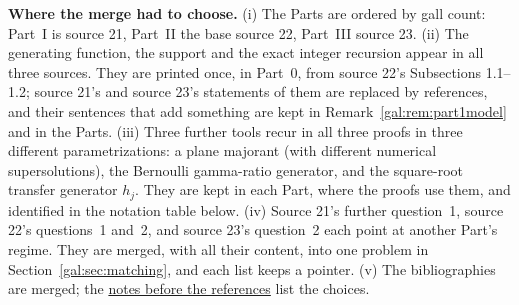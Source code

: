\documentclass[11pt,letterpaper]{article}
\numberwithin{equation}{section}
\theoremstyle{definition}\newtheorem{definition}[theorem]{Definition}
\theoremstyle{remark}\newtheorem{remark}[theorem]{Remark}
\begin{document}
\noindent\textbf{Where the merge had to choose.}
(i) The Parts are ordered by gall count: Part~I is source 21, Part~II the base source 22, Part~III source 23. (ii) The generating function, the support and the exact integer recursion appear in all three sources. They are printed once, in Part~0, from source 22's Subsections 1.1--1.2; source 21's and source 23's statements of them are replaced by references, and their sentences that add something are kept in Remark~\ref{gal:rem:part1model} and in the Parts. (iii) Three further tools recur in all three proofs in three different parametrizations: a plane majorant (with different numerical supersolutions), the Bernoulli gamma-ratio generator, and the square-root transfer generator $h_j$. They are kept in each Part, where the proofs use them, and identified in the notation table below. (iv) Source 21's further question~1, source 22's questions~1 and~2, and source 23's question~2 each point at another Part's regime. They are merged, with all their content, into one problem in Section~\ref{gal:sec:matching}, and each list keeps a pointer. (v) The bibliographies are merged; the \hyperref[gal:sec:bibnotes]{notes before the references} list the choices.
\end{document}
